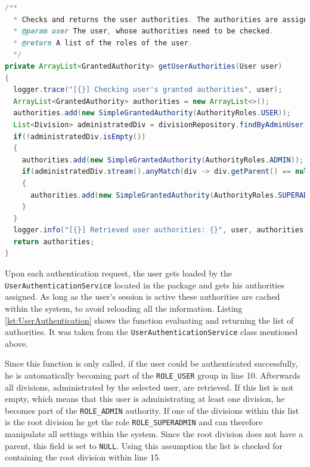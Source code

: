 \begin{lstlisting}[caption ={User role assessment executed upon authentication (slightly modified for readability)}, label=lst:UserAuthentication, language=Java]
/**
  * Checks and returns the user authorities. The authorities are assigned according to the {@link de.steilerdev.myVerein.server.security.UserAuthenticationService.AuthorityRoles AuthorityRoles} enum.
  * @param user The user, whose authorities need to be checked.
  * @return A list of the roles of the user.
  */
private ArrayList<GrantedAuthority> getUserAuthorities(User user)
{
  logger.trace("[{}] Checking user's granted authorities", user);
  ArrayList<GrantedAuthority> authorities = new ArrayList<>();
  authorities.add(new SimpleGrantedAuthority(AuthorityRoles.USER));
  List<Division> administratedDiv = divisionRepository.findByAdminUser(user);
  if(!administratedDiv.isEmpty())
  {
    authorities.add(new SimpleGrantedAuthority(AuthorityRoles.ADMIN));
    if(administratedDiv.stream().anyMatch(div -> div.getParent() == null))
    {
      authorities.add(new SimpleGrantedAuthority(AuthorityRoles.SUPERADMIN));
    }
  }
  logger.info("[{}] Retrieved user authorities: {}", user, authorities);
  return authorities;
}
\end{lstlisting}

Upon each authentication request, the user gets loaded by the \texttt{UserAuthenticationService} located in the  package and gets his authorities assigned. As long as the user's session is active these authorities are cached within the system, to avoid reloading all the information. Listing \ref{lst:UserAuthentication} shows the function evaluating and returning the list of authorities. It was taken from the \texttt{UserAuthenticationService} class mentioned above. 

Since this function is only called, if the user could be authenticated successfully, he is automatically becoming part of the \texttt{ROLE\_USER} group in line 10. Afterwards all divisions, administrated by the selected user, are retrieved. If this list is not empty, which means that this user is administrating at least one division, he becomes part of the \texttt{ROLE\_ADMIN} authority. If one of the divisions within this list is the root division he get the role \texttt{ROLE\_SUPERADMIN} and can therefore manipulate all settings within the system. Since the root division does not have a parent, this field is set to \texttt{NULL}. Using this assumption the list is checked for containing the root division within line 15.

